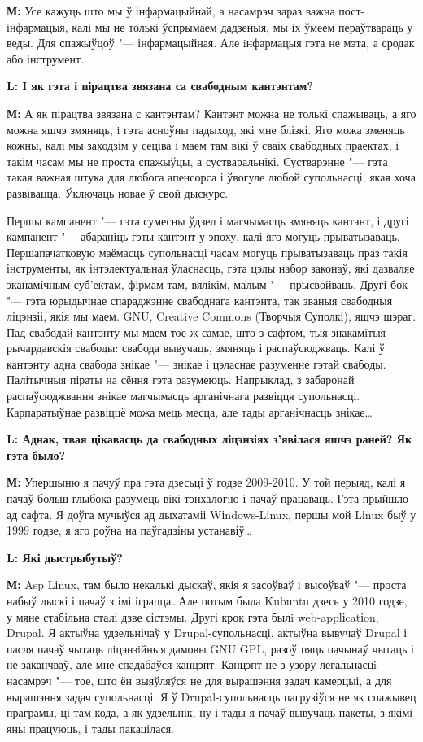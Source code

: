 \documentclass[10pt, a5paper]{article}
\begin{document}
{\noindent \bf М:}  Усе кажуць што мы ў інфармацыйнай, а насамрэч зараз важна пост-інфармацыя, калі мы не толькі ўспрымаем дадзеныя, мы іх ўмеем пераўтвараць у веды. Для спажыўцоў "--- інфармацыйная. Але iнфармацыя гэта не мэта, а сродак або інструмент.

{\noindent \bf L: І як гэта і пірацтва звязана са свабодным кантэнтам?}

{\noindent \bf М:} А як пірацтва звязана с кантэнтам? Кантэнт можна не толькі спажываць, а яго можна яшчэ змяняць, i гэта асноўны падыход, які мне блізкі. Яго можа зменяць кожны, калі мы заходзім у сеціва і маем там вікі ў сваіх свабодных праектах, і такім часам мы не проста спажыўцы, а сустваральнікі. Сустварэнне "--- гэта такая важная штука для любога апенсорса і ўвогуле любой супольнасці, якая хоча развівацца. Ўключаць новае ў свой дыскурс.

Першы кампанент "--- гэта сумесны ўдзел і магчымасць змяняць кантэнт, і другі кампанент "--- абараніць гэты кантэнт у эпоху, калі яго могуць прыватызаваць. Першапачатковую маёмасць супольнасці часам могуць прыватызаваць праз такія інструменты, як інтэлектуальная ўласнасць, гэта цэлы набор законаў, які дазваляе эканамічным суб'ектам, фірмам там, вялікім, малым "--- прысвойваць. Другі бок "--- гэта юрыдычнае спараджэнне свабоднага кантэнта, так званыя свабодныя ліцэнзіі, якія мы маем. GNU, Creative Commons (Творчыя Суполкі), яшчэ шэраг. Пад свабодай кантэнту мы маем тое ж самае, што з сафтом, тыя знакамітыя рычардавскія свабоды: свабода вывучаць, змяняць і распаўсюджваць. Калі ў кантэнту адна свабода знікае "--- знікае і цэласнае разуменне гэтай свабоды. Палітычныя піраты на сёння гэта разумеюць. Напрыклад, з забаронай распаўсюджвання знікае магчымасць арганічнага развіцця супольнасці. Карпаратыўнае развіццё можа мець месца, але тады арганічнасць знікае\ldots


{\noindent \bf L: Аднак, твая цікавасць да свабодных ліцэнзіях з'явілася яшчэ раней? Як гэта было?}

{\noindent \bf М:} Упершыню я пачуў пра гэта дзесьці ў годзе 2009-2010. У той перыяд, калі я пачаў больш глыбока разумець вікі-тэнхалогію і пачаў працаваць. Гэта прыйшло ад сафта. Я доўга мучыўся ад дыхатаміі Wіndows-Lіnux, першы мой Lіnux быў у 1999 годзе, я яго роўна на паўгадзіны устанавіў\ldots

{\noindent \bf L: Які дыстрыбутыў?}

{\noindent \bf М:} Asp Lіnux, там было некалькі дыскаў, якія я засоўваў і высоўваў "--- проста набыў дыскі і пачаў з імі іграцца\ldots Але потым была Kubuntu дзесь у 2010 годзе, у мяне стабільна сталі дзве сістэмы. Другі крок гэта былi web-applіcatіon, Drupal. Я актыўна удзельнічаў у Drupal-супольнасці, актыўна вывучаў Drupal і пасля пачаў чытаць лiцэнзiйныя дамовы GNU GPL, разоў пяць пачынаў чытаць і не заканчваў, але мне спадабаўся канцэпт. Канцэпт не з узору легальнасцi насамрэч "--- тое, што ён выяўляўся не для вырашэння задач камерцыі, а для вырашэння задач супольнасці. Я ў Drupal-супольнасць пагрузіўся не як спажывец праграмы, ці там кода, а як удзельнік, ну і тады я пачаў вывучаць пакеты, з якімі яны працуюць, і тады пакацілася. 
\end{document}
